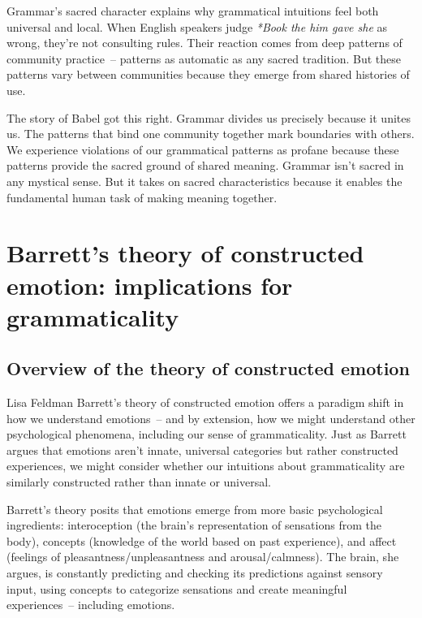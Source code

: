 Grammar's sacred character explains why grammatical intuitions feel both universal and local. When English speakers judge \textit{*Book the him gave she} as wrong, they're not consulting rules. Their reaction comes from deep patterns of community practice~-- patterns as automatic as any sacred tradition. But these patterns vary between communities because they emerge from shared histories of use.

The story of Babel got this right. Grammar divides us precisely because it unites us. The patterns that bind one community together mark boundaries with others. We experience violations of our grammatical patterns as profane because these patterns provide the sacred ground of shared meaning. Grammar isn't sacred in any mystical sense. But it takes on sacred characteristics because it enables the fundamental human task of making meaning together.

\section{Barrett's theory of constructed emotion: implications for grammaticality}

\subsection{Overview of the theory of constructed emotion}

Lisa Feldman Barrett's theory of constructed emotion offers a paradigm shift in how we understand emotions~-- and by extension, how we might understand other psychological phenomena, including our sense of grammaticality. Just as Barrett argues that emotions aren't innate, universal categories but rather constructed experiences, we might consider whether our intuitions about grammaticality are similarly constructed rather than innate or universal.

Barrett's theory posits that emotions emerge from more basic psychological ingredients: interoception (the brain's representation of sensations from the body), concepts (knowledge of the world based on past experience), and affect (feelings of pleasantness/unpleasantness and arousal/calmness). The brain, she argues, is constantly predicting and checking its predictions against sensory input, using concepts to categorize sensations and create meaningful experiences~-- including emotions.

